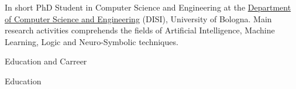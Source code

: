 \documentclass{resume} %
\begin{document}
    
    \begin{rSection}{In short}
        PhD Student in Computer Science and Engineering at the \href{https://disi.unibo.it/it}{Department of Computer Science and Engineering} (DISI), University of Bologna.
        Main research activities comprehends the fields of Artificial Intelligence, Machine Learning, Logic and Neuro-Symbolic techniques.
        
    \end{rSection}
    
    \begin{rSection}{Education and Carreer}

        
        \begin{rSubsection2}{Education}


\end{rSubsection2}
\end{rSection}
\end{document}
